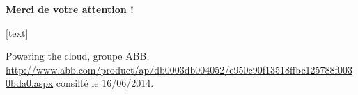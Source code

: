 \documentclass[xcolor=dvipsnames]{beamer}
\begin{document}
\begin{frame} 
\begin{block}{}
\begin{center}
\textbf{
{\Huge Merci de votre attention !}}
\end{center}
\end{block}
\vspace{3cm}
{\tiny {}[text] 
\begin{thebibliography}{99} 

 Powering the cloud, groupe ABB, \url{http://www.abb.com/product/ap/db0003db004052/e950c90f13518ffbc125788f0030bda0.aspx} consilté le 16/06/2014.

\end{thebibliography} }
\end{frame} 
\end{document}
